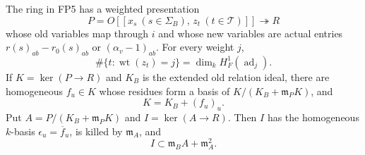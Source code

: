 \begin{proposition}
\label{claim:FP6}
The ring in FP5 has a weighted presentation
\[
 P=O[[x_s\ (s\in\Sigma_B),\,z_t\ (t\in\mathcal T)]]
       \twoheadrightarrow R
 \tag{FP.15}
\]
whose old variables map through $i$ and whose new variables are
actual entries $r(s)_{ab}-r_0(s)_{ab}$ or $(\alpha_v-1)_{ab}$.
For every weight $j$,
\[
 \#\{t:\operatorname{wt}(z_t)=j\}
            =\dim_k H^1_F(\operatorname{ad}_j).
 \tag{FP.16}
\]
If $K=\ker(P\to R)$ and $K_B$ is the extended old relation ideal,
there are homogeneous $f_u\in K$ whose residues form a basis of
$K/(K_B+\mathfrak m_PK)$, and
\[
                     K=K_B+(f_u)_u .
 \tag{FP.17}
\]
Put $A=P/(K_B+\mathfrak m_PK)$ and $I=\ker(A\to R)$.
Then $I$ has the homogeneous $k$-basis
$\epsilon_u=\overline f_u$, is killed by $\mathfrak m_A$, and
\[
                     I\subset\mathfrak m_BA+\mathfrak m_A^2.
 \tag{FP.18}
\]
\end{proposition}

